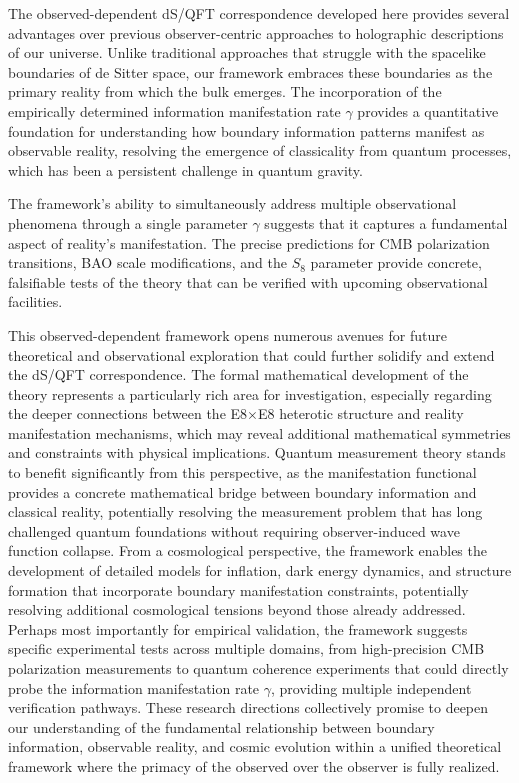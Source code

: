 \documentclass[11pt,english,twoside]{article}
\theoremstyle{plain}
\theoremstyle{definition}
\theoremstyle{remark}
\newcommand{\gammaR}{\gamma}
\begin{document}
The observed-dependent dS/QFT correspondence developed here provides several advantages over previous observer-centric approaches to holographic descriptions of our universe. Unlike traditional approaches that struggle with the spacelike boundaries of de Sitter space, our framework embraces these boundaries as the primary reality from which the bulk emerges. The incorporation of the empirically determined information manifestation rate $\gammaR$ provides a quantitative foundation for understanding how boundary information patterns manifest as observable reality, resolving the emergence of classicality from quantum processes, which has been a persistent challenge in quantum gravity.

The framework's ability to simultaneously address multiple observational phenomena through a single parameter $\gammaR$ suggests that it captures a fundamental aspect of reality's manifestation. The precise predictions for CMB polarization transitions, BAO scale modifications, and the $S_8$ parameter provide concrete, falsifiable tests of the theory that can be verified with upcoming observational facilities.

This observed-dependent framework opens numerous avenues for future theoretical and observational exploration that could further solidify and extend the dS/QFT correspondence. The formal mathematical development of the theory represents a particularly rich area for investigation, especially regarding the deeper connections between the E8$\times$E8 heterotic structure and reality manifestation mechanisms, which may reveal additional mathematical symmetries and constraints with physical implications. Quantum measurement theory stands to benefit significantly from this perspective, as the manifestation functional provides a concrete mathematical bridge between boundary information and classical reality, potentially resolving the measurement problem that has long challenged quantum foundations without requiring observer-induced wave function collapse. From a cosmological perspective, the framework enables the development of detailed models for inflation, dark energy dynamics, and structure formation that incorporate boundary manifestation constraints, potentially resolving additional cosmological tensions beyond those already addressed. Perhaps most importantly for empirical validation, the framework suggests specific experimental tests across multiple domains, from high-precision CMB polarization measurements to quantum coherence experiments that could directly probe the information manifestation rate $\gammaR$, providing multiple independent verification pathways. These research directions collectively promise to deepen our understanding of the fundamental relationship between boundary information, observable reality, and cosmic evolution within a unified theoretical framework where the primacy of the observed over the observer is fully realized.
\end{document}
